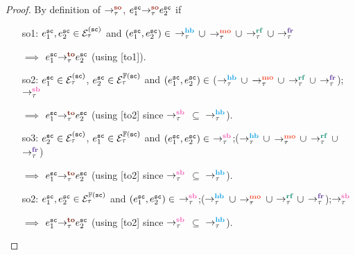 {
	\label{lem:so subset to}}
\begin{proof}
		By definition of $\setSO$, $\so{\tau}{e^\sc_1}{e^\sc_2}$ if
		\begin{itemize}[label=so4,align=left,leftmargin=*]
			\item [so1:] $e^\sc_1, e^\sc_2 \in \ordevents{\sc}_\tau$
				and $(e^\sc_1, e^\sc_2) \in$ $\setHB$ $\union$ 
				$\setMO$ $\union$ $\setRF$ $\union$ $\setFR$
				
				$\implies$ $\to{\tau}{e^\sc_1}{e^\sc_2}$
				(using [to1]).
				
			\item [so2:] $e^\sc_1 \in \ordevents{\sc}_\tau$,
				$e^\sc_2 \in \ordfences{\sc}_\tau$
				and $(e^\sc_1, e^\sc_2) \in$ ($\setHB$ $\union$ 
				$\setMO$ $\union$ $\setRF$ $\union$ $\setFR$);$\setSB$
			
				$\implies$ $\to{\tau}{e^\sc_1}{e^\sc_2}$
				(using [to2] since $\setSB$ $\subseteq$ $\setHB$).
				
			\item [so3:] $e^\sc_2 \in \ordevents{\sc}_\tau$,
				$e^\sc_1 \in \ordfences{\sc}_\tau$
				and $(e^\sc_1, e^\sc_2) \in$ $\setSB$;($\setHB$ 
				$\union$ $\setMO$ $\union$ $\setRF$ $\union$ $\setFR$)
			
				$\implies$ $\to{\tau}{e^\sc_1}{e^\sc_2}$
				(using [to2] since $\setSB$ $\subseteq$ $\setHB$).
				
			\item [so2:] $e^\sc_1, e^\sc_2 \in \ordfences{\sc}_\tau$
				and $(e^\sc_1, e^\sc_2) \in$ $\setSB$;($\setHB$ $\union$ 
				$\setMO$ $\union$ $\setRF$ $\union$ $\setFR$);$\setSB$
			
				$\implies$ $\to{\tau}{e^\sc_1}{e^\sc_2}$
				(using [to2] since $\setSB$ $\subseteq$ $\setHB$).
		\end{itemize}
\end{proof}


